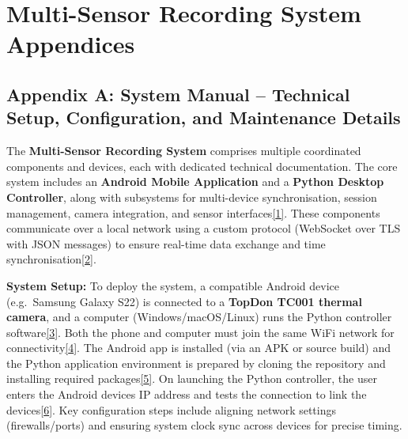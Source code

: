 \documentclass[12pt,a4paper]{article}
\begin{document}
\section{Multi-Sensor Recording System Appendices}\label{multi-sensor-recording-system-appendices}

\subsection{Appendix A: System Manual -- Technical Setup, Configuration, and Maintenance Details}\label{appendix-a-system-manual-technical-setup-configuration-and-maintenance-details}

The \textbf{Multi-Sensor Recording System} comprises multiple coordinated components and devices, each with dedicated technical documentation. The core system includes an \textbf{Android Mobile Application} and a \textbf{Python Desktop Controller}, along with subsystems for multi-device synchronisation, session management, camera integration, and sensor interfaces\href{docs/thesis_report/Chapter_7_Appendices.md\#L60-L68}{{[}1{]}}. These components communicate over a local network using a custom protocol (WebSocket over TLS with JSON messages) to ensure real-time data exchange and time synchronisation\href{docs/thesis_report/Chapter_7_Appendices.md\#L111-L119}{{[}2{]}}.

\textbf{System Setup:} To deploy the system, a compatible Android device (e.g.~Samsung Galaxy S22) is connected to a \textbf{TopDon TC001 thermal camera}, and a computer (Windows/macOS/Linux) runs the Python controller software\href{docs/QUICK_START.md\#L5-L13}{{[}3{]}}. Both the phone and computer must join the same WiFi network for connectivity\href{docs/QUICK_START.md\#L14-L17}{{[}4{]}}. The Android app is installed (via an APK or source build) and the Python application environment is prepared by cloning the repository and installing required packages\href{docs/QUICK_START.md\#L20-L28}{{[}5{]}}. On launching the Python controller, the user enters the Android device\textquotesingle s IP address and tests the connection to link the devices\href{docs/QUICK_START.md\#L35-L44}{{[}6{]}}. Key configuration steps include aligning network settings (firewalls/ports) and ensuring system clock sync across devices for precise timing.
\end{document}
